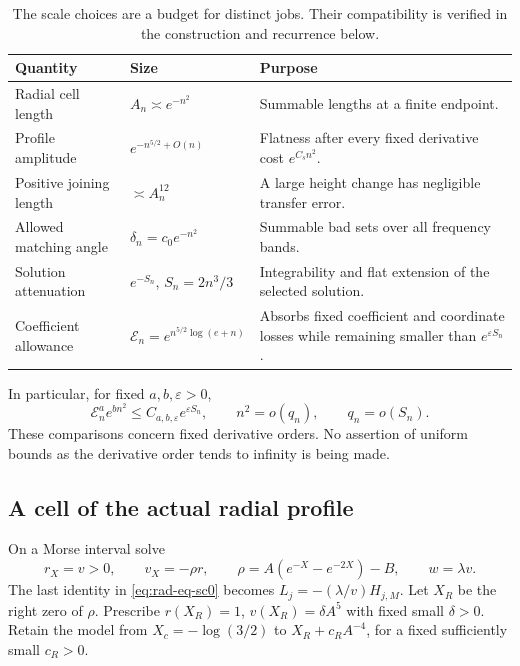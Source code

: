 \begin{table}[htbp]
\centering
\begin{tabularx}{\linewidth}{@{}l l X@{}}
\toprule
Quantity & Size & Purpose\\
\midrule
Radial cell length & $A_n\asymp e^{-n^2}$ & Summable lengths at a finite endpoint.\\
Profile amplitude & $e^{-n^{5/2}+O(n)}$ & Flatness after every fixed derivative cost $e^{C_sn^2}$.\\
Positive joining length & $\asymp A_n^{12}$ & A large height change has negligible transfer error.\\
Allowed matching angle & $\delta_n=c_0e^{-n^2}$ & Summable bad sets over all frequency bands.\\
Solution attenuation & $e^{-S_n}$, $S_n=2n^3/3$ & Integrability and flat extension of the selected solution.\\
Coefficient allowance & $\mathcal E_n=e^{n^{5/2}\log(e+n)}$ & Absorbs fixed coefficient and coordinate losses while remaining smaller than $e^{\varepsilon S_n}$.\\
\bottomrule
\end{tabularx}
\caption{The scale choices are a budget for distinct jobs.  Their
compatibility is verified in the construction and recurrence below.}
\label{tab:endpoint-budget}
\end{table}

In particular, for fixed $a,b,\varepsilon>0$,
\begin{equation}\label{eq:rad-scale-separation}
 \mathcal E_n^a e^{bn^2}\le C_{a,b,\varepsilon}e^{\varepsilon S_n},
 \qquad n^2=o(q_n),\qquad q_n=o(S_n).
\end{equation}
These comparisons concern fixed derivative orders.  No assertion of
uniform bounds as the derivative order tends to infinity is being made.

\subsection{A cell of the actual radial profile}

On a Morse interval solve
\begin{equation}\label{eq:rad-eq-rm4}
 r_X=v>0,\qquad v_X=-\rho r,\qquad
 \rho=A(e^{-X}-e^{-2X})-B,\qquad w=\lambda v.
\end{equation}
The last identity in \eqref{eq:rad-eq-sc0} becomes
$L_j=-(\lambda/v)H_{j,M}$.  Let $X_R$ be the right zero of $\rho$.
Prescribe $r(X_R)=1$, $v(X_R)=\delta A^5$ with fixed small
$\delta>0$.  Retain the model from $X_c=-\log(3/2)$ to
$X_R+c_RA^{-4}$, for a fixed sufficiently small $c_R>0$.

